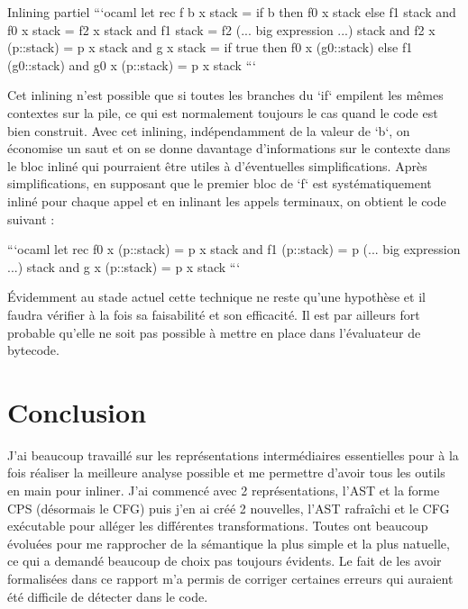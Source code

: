 \documentclass{beamer}
\begin{document}
\begin{frame}{Inlining partiel}
    ```ocaml
    let rec f b x stack =
      if b then f0 x stack else f1 stack
    and f0 x stack =
      f2 x stack
    and f1 stack =
      f2 (... big expression ...) stack
    and f2 x (p::stack) =
      p x stack
    and g x stack =
      if true then f0 x (g0::stack) else f1 (g0::stack)
    and g0 x (p::stack) =
      p x stack
    ```
    
    Cet inlining n'est possible que si toutes les branches du `if` empilent les mêmes contextes sur la pile, ce qui est normalement toujours le cas quand le code est bien construit. Avec cet inlining, indépendamment de la valeur de `b`, on économise un saut et on se donne davantage d'informations sur le contexte dans le bloc inliné qui pourraient être utiles à d'éventuelles simplifications. Après simplifications, en supposant que le premier bloc de `f` est systématiquement inliné pour chaque appel et en inlinant les appels terminaux, on obtient le code suivant :
    
    ```ocaml
    let rec f0 x (p::stack) =
      p x stack
    and f1 (p::stack) =
      p (... big expression ...) stack
    and g x (p::stack) =
      p x stack
    ```
    
    Évidemment au stade actuel cette technique ne reste qu'une hypothèse et il faudra vérifier à la fois sa faisabilité et son efficacité. Il est par ailleurs fort probable qu'elle ne soit pas possible à mettre en place dans l'évaluateur de bytecode.
\end{frame}

\section{Conclusion}

J'ai beaucoup travaillé sur les représentations intermédiaires essentielles pour à la fois réaliser la meilleure analyse possible et me permettre d'avoir tous les outils en main pour inliner. J'ai commencé avec 2 représentations, l'AST et la forme CPS (désormais le CFG) puis j'en ai créé 2 nouvelles, l'AST rafraîchi et le CFG exécutable pour alléger les différentes transformations. Toutes ont beaucoup évoluées pour me rapprocher de la sémantique la plus simple et la plus natuelle, ce qui a demandé beaucoup de choix pas toujours évidents. Le fait de les avoir formalisées dans ce rapport m'a permis de corriger certaines erreurs qui auraient été difficile de détecter dans le code.
\end{document}
